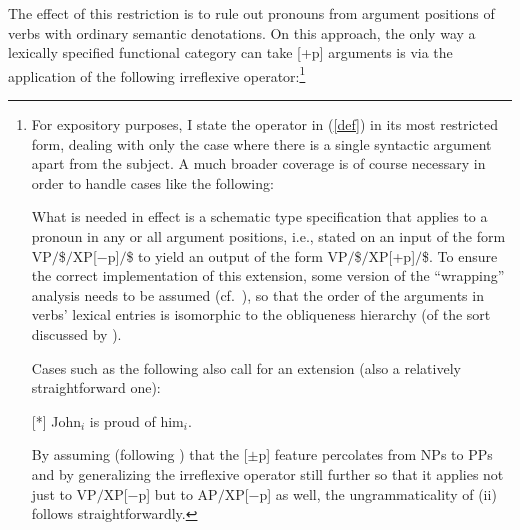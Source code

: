 \documentclass[output=paper
                ,modfonts
 	        ,biblatex
                ,babelshorthands
                ,newtxmath
                ,draftmode
                ,colorlinks, citecolor=brown
]{langscibook}
\begin{document}
\begin{exe}
 \ex\label{le}
\end{exe}
\largerpage
The effect of this restriction is to rule out pronouns from argument
positions of verbs with ordinary semantic denotations. On this
approach, the only way a lexically specified functional category can
take [+p] arguments is via the application of the following
irreflexive operator:\footnote{For expository purposes, I state the
operator in (\ref{def}) in its most restricted form, dealing with only the
case where there is a single syntactic argument apart from the
subject. A much broader coverage is of course necessary in order to
handle cases like the following:

\begin{exe}
  \begin{xlist}
 \end{xlist}
\end{exe}
What is needed in effect is a schematic type specification that applies
to a pronoun in any or all argument positions, i.e., stated on an
input of the form VP\ensuremath{/}\$\ensuremath{/}XP[$-$p]\ensuremath{/}\$ to yield an output of 
the form VP\ensuremath{/}\$\ensuremath{/}XP[+p]\ensuremath{/}\$. To ensure the correct implementation
of this extension, some version of the ``wrapping'' analysis needs to be
assumed (cf.\ \citealt[194]{Jacobson07}), so that the order of the arguments in 
verbs' lexical entries is isomorphic to the obliqueness hierarchy (of
the sort discussed by \citealt{PS92a}).

Cases such as the following also call for an extension (also a
relatively straightforward one):

\begin{exe}
 [*]{
  John\ensuremath{_i} is proud of him\ensuremath{_i}.
}
\end{exe}
By assuming (following \citealt{Jacobson07}) that the [$\pm$p] feature
percolates from NPs to PPs and by generalizing the irreflexive
operator still further so that it applies not just to VP\ensuremath{/}XP[$-$p] but to
AP\ensuremath{/}XP[$-$p] as well, the ungrammaticality of (ii) follows
straightforwardly.}
\end{document}
